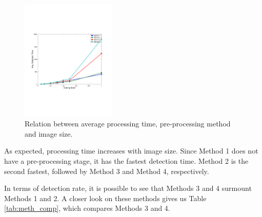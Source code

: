 \documentclass[conference, letterpaper]{IEEEtran}
\begin{document}
\begin{figure}[!ht]
	\centering
    \includegraphics[width=0.4\textwidth, trim={1.6cm 6.9cm 2.3cm 6.7cm}]{./fig/detection_time_emb.pdf}
    \caption{Relation between average processing time, pre-processing method and image size.}
	\label{fig:processing_time}
\end{figure}

As expected, processing time increases with image size. Since Method 1
does not have a pre-processing stage, it has the fastest detection time. Method
2 is the second fastest, followed by Method 3 and Method 4, respectively. 

In terms of detection rate, it is possible to see that Methods 3 and 4
surmount Methods 1 and 2.  A closer look on these methods gives us Table
\ref{tab:meth_comp}, which compares Methods 3 and 4.
\end{document}
